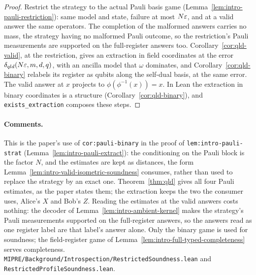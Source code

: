 \begin{proof}
\leanok
Restrict the strategy to the actual Pauli basis game (Lemma~\ref{lem:intro-pauli-restriction}): same
model and state, failure at most $N\varepsilon$, and at a valid answer the same operators. The completion
of the malformed answers carries no mass, the strategy having no malformed Pauli outcome, so the
restriction's Pauli measurements are supported on the full-register answers too.
Corollary~\ref{cor:qld-valid}, at the restriction, gives an extraction in field coordinates at the
error $\delta_{qld}(N\varepsilon, m, d, q)$, with an ancilla model that $\omega$ dominates, and
Corollary~\ref{cor:qld-binary} relabels its register as qubits along the self-dual basis, at the
same error. The valid answer at $x$ projects to $\phi(\phi^{-1}(x)) = x$. In Lean the extraction in
binary coordinates is a structure (Corollary~\ref{cor:qld-binary}), and
\texttt{exists\_extraction} composes these steps.
\end{proof}

\paragraph{Comments.} This is the paper's use of \texttt{cor:pauli-binary} in the proof of
\texttt{lem:intro-pauli-strat} (Lemma~\ref{lem:intro-pauli-extract}): the conditioning on the
Pauli block is the factor $N$, and the estimates are kept as distances, the form
Lemma~\ref{lem:intro-valid-isometric-soundness} consumes, rather than used to replace the strategy
by an exact one. Theorem~\ref{thm:qld} gives all four Pauli estimates, as the paper states them;
the extraction keeps the two the consumer uses, Alice's $X$ and Bob's $Z$. Reading the estimates at
the valid answers costs nothing: the decoder of Lemma~\ref{lem:intro-ambient-kernel} makes the
strategy's Pauli measurements supported on the full-register answers, so the answers read as one
register label are that label's answer alone. Only the binary game is used for soundness; the
field-register game of Lemma~\ref{lem:intro-full-typed-completeness} serves completeness.
\texttt{MIPRE/Background/Introspection/RestrictedSoundness.lean} and
\texttt{RestrictedProfileSoundness.lean}.


